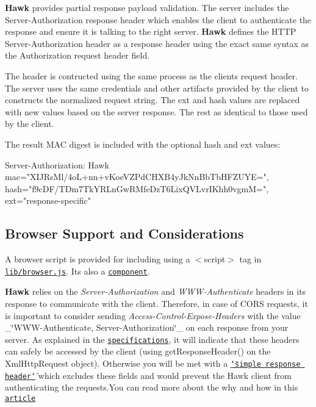 {\bfseries Hawk} provides partial response payload validation. The server includes the {\ttfamily Server-\/\+Authorization} response header which enables the client to authenticate the response and ensure it is talking to the right server. {\bfseries Hawk} defines the H\+T\+TP {\ttfamily Server-\/\+Authorization} header as a response header using the exact same syntax as the {\ttfamily Authorization} request header field.

The header is contructed using the same process as the client\textquotesingle{}s request header. The server uses the same credentials and other artifacts provided by the client to constructs the normalized request string. The {\ttfamily ext} and {\ttfamily hash} values are replaced with new values based on the server response. The rest as identical to those used by the client.

The result M\+AC digest is included with the optional {\ttfamily hash} and {\ttfamily ext} values\+:


\begin{DoxyCode}
Server-Authorization: Hawk mac="XIJRsMl/4oL+nn+vKoeVZPdCHXB4yJkNnBbTbHFZUYE=",
       hash="f9cDF/TDm7TkYRLnGwRMfeDzT6LixQVLvrIKhh0vgmM=", ext="response-specific"
\end{DoxyCode}


\subsection*{Browser Support and Considerations}

A browser script is provided for including using a {\ttfamily $<$script$>$} tag in \href{/lib/browser.js}{\tt lib/browser.\+js}. It\textquotesingle{}s also a \href{http://component.io/hueniverse/hawk}{\tt component}.

{\bfseries Hawk} relies on the {\itshape Server-\/\+Authorization} and {\itshape W\+W\+W-\/\+Authenticate} headers in its response to communicate with the client. Therefore, in case of C\+O\+RS requests, it is important to consider sending {\itshape Access-\/\+Control-\/\+Expose-\/\+Headers} with the value \+\_\+\char`\"{}\+W\+W\+W-\/\+Authenticate, Server-\/\+Authorization\char`\"{}\+\_\+ on each response from your server. As explained in the \href{http://www.w3.org/TR/cors/#access-control-expose-headers-response-header}{\tt specifications}, it will indicate that these headers can safely be accessed by the client (using get\+Response\+Header() on the Xml\+Http\+Request object). Otherwise you will be met with a \href{http://www.w3.org/TR/cors/#simple-response-header}{\tt \char`\"{}simple response header\char`\"{}} which excludes these fields and would prevent the Hawk client from authenticating the requests.\+You can read more about the why and how in this \href{http://www.html5rocks.com/en/tutorials/cors/#toc-adding-cors-support-to-the-server}{\tt article}

